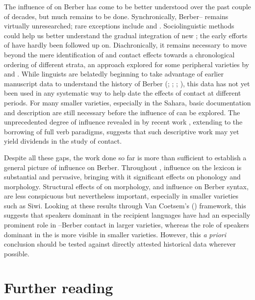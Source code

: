 \documentclass[output=paper]{langsci/langscibook}
\begin{document}
The influence of  on Berber has come to be better understood over the past couple of decades, but much remains to be done.  Synchronically, Berber–  remains virtually unresearched; rare exceptions include \citet{Hamza2007} and \citet{Kossmann2012}. Sociolinguistic methods could help us better understand the gradual integration of new  ; the early efforts of \citet{Brahimi2000} have hardly been followed up on. Diachronically, it remains necessary to move beyond the mere identification of  and contact effects towards a chronological ordering of different strata, an approach explored for some peripheral varieties by \citet{Souag2009} and \citet{vanPuttenBenkato2017}. While linguists are belatedly beginning to take advantage of earlier manuscript data to understand the history of Berber (\citealt{Boogert1997}; \citeyear{Boogert1998}; \citealt{Brugnatelli2011}; \citealt{Meouak2015}), this data has not yet been used in any systematic way to help date the effects of contact at different periods. For many smaller varieties, especially in the Sahara, basic documentation and description are still necessary before the influence of  can be explored. The unprecedented degree of  influence revealed in  by recent work \citep{Mourigh2016}, extending to the borrowing of full verb paradigms, suggests that such descriptive work may yet yield dividends in the study of contact.

Despite all these gaps, the work done so far is more than sufficient to establish a general picture of  influence on Berber. Throughout ,  influence on the lexicon is substantial and pervasive, bringing with it significant effects on phonology and morphology. Structural effects of  on morphology, and  influence on Berber syntax, are less conspicuous but nevertheless important, especially in smaller varieties such as Siwi. Looking at these results through Van Coetsem's (\citeyear{VanCoetsem1988,VanCoetsem2000}) framework, this suggests that speakers dominant in the recipient languages have had an especially prominent role in –Berber contact in larger varieties, whereas the role of speakers dominant in the  is more visible in smaller varieties.  However, this \textit{a} \textit{priori} conclusion should be tested against directly attested historical data wherever possible.

\section*{Further reading}
\end{document}
